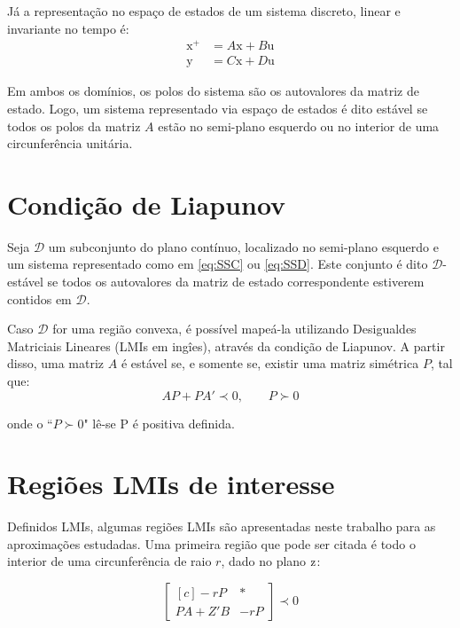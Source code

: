 Já a representação no espaço de estados de um sistema discreto, linear e invariante no tempo é:
\begin{subequations}
  \label{eq:SSD}
  \begin{align}
    \pmb{\mathrm{x^+}} &= A\pmb{\mathrm{x}} + B\pmb{\mathrm{u}}\label{eq:SSDEntrada}\\
    \pmb{\mathrm{y}} &= C\pmb{\mathrm{x}} + D\pmb{\mathrm{u}}\label{eq:SSDSaida}
  \end{align}
\end{subequations}

Em ambos os domínios, os polos do sistema são os autovalores da matriz de estado. Logo, um sistema representado via espaço de estados é dito estável se todos os polos da matriz $A$ estão no semi-plano esquerdo ou no interior de uma circunferência unitária.

\section{Condição de Liapunov}
Seja $\mathcal{D}$ um subconjunto do plano contínuo, localizado no semi-plano esquerdo e um sistema representado como em \eqref{eq:SSC} ou \eqref{eq:SSD}. Este conjunto é dito $\mathcal{D}$-estável se todos os autovalores da matriz de estado correspondente estiverem contidos em $\mathcal{D}$.

Caso $\mathcal{D}$ for uma região convexa, é possível mapeá-la utilizando Desigualdes Matriciais Lineares (LMIs em ingîes)\cite{CHILALI1996}, através da condição de Liapunov. A partir disso, uma matriz $A$ é estável se, e somente se, existir uma matriz simétrica $P$, tal que:
\begin{equation}
  AP + PA' \prec 0, \qquad P \succ 0\label{eq:LiapunovCondition}
\end{equation}

\noindent onde o ``$P \succ 0$" lê-se P é positiva definida.

\section{Regiões LMIs de interesse}
Definidos LMIs, algumas regiões LMIs são apresentadas neste trabalho para as aproximações estudadas. Uma primeira região que pode ser citada é todo o interior de uma circunferência de raio $r$, dado no plano $\operatorname{\mathrm{z}}$:

\begin{equation}
  \begin{bmatrix*}[c]
    -rP       & * \\
    PA + Z'B  & -rP
  \end{bmatrix*}
  \prec 0\label{eq:LMIEstabilidadeRelativa}
\end{equation}

